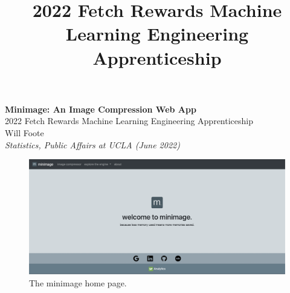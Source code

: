 \documentclass[10pt]{article}
\author{}
\title{2022 Fetch Rewards Machine Learning Engineering Apprenticeship}
\begin{document}
	
	\begin{center}
		{\Large \textbf{Minimage: An Image Compression Web App}}\\[1ex]
		{\large{2022 Fetch Rewards Machine Learning Engineering Apprenticeship}}\\
		\vspace{1em}
		{\large Will Foote}\\
		\vspace{.75em}
		\textit{Statistics, Public Affairs at UCLA (June 2022)}
		
\begin{figure}[H]
    \centering
	\includegraphics[width=.5\columnwidth]{home.png}
	\caption{The minimage home page.}
	\label{fig:fig1}
\end{figure}

	\end{center}
	


	
	
	


	\vspace{3mm}
	
\end{document}
